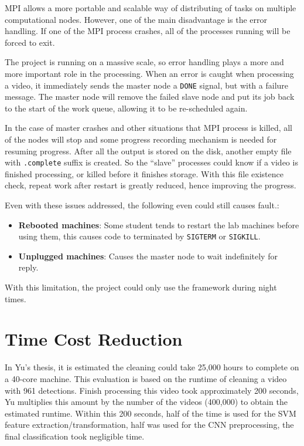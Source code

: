 \documentclass[bsc,logo,twoside,fullspacing,parskip]{infthesis}
\begin{document}
MPI allows a more portable and scalable way of distributing of tasks on multiple computational nodes.
However, one of the main disadvantage is the error handling. 
If one of the MPI process crashes, all of the processes running will be forced to exit.

The project is running on a massive scale, so error handling plays a more and more important role in the processing. 
When an error is caught when processing a video, it immediately sends the master node a {\tt DONE} signal, but with a failure message. The master node will remove the failed slave node and put its job back to the start of the work queue, allowing it to be re-scheduled again.

In the case of master crashes and other situations that MPI process is killed, all of the nodes will stop and some progress recording mechanism is needed for resuming progress. After all the output is stored on the disk, another empty file with {\tt .complete} suffix is created. So the ``slave'' processes could know if a video is finished processing, or killed before it finishes storage. With this file existence check, repeat work after restart is greatly reduced, hence improving the progress.

Even with these issues addressed, the following even could still causes fault.:
\begin{itemize}
\setlength{\parskip}{0pt}
\item \textbf{Rebooted machines}: Some student tends to restart the lab machines before using them, this causes code to terminated by {\tt SIGTERM} or {\tt SIGKILL}.
\item \textbf{Unplugged machines}: Causes the master node to wait indefinitely for reply.
\end{itemize}
With this limitation, the project could only use the framework during night times.

\section{Time Cost Reduction} 

In Yu's thesis\cite{Yu}, it is estimated the cleaning could take 25,000 hours to complete on a 40-core machine.
This evaluation is based on the runtime of cleaning a video with 961 detections.
Finish processing this video took approximately 200 seconds, Yu multiplies this amount by the number of the videos (400,000) to obtain the estimated runtime.
Within this 200 seconds, half of the time is used for the SVM feature extraction/transformation, half was used for the CNN preprocessing, the final classification took negligible time.
\end{document}
